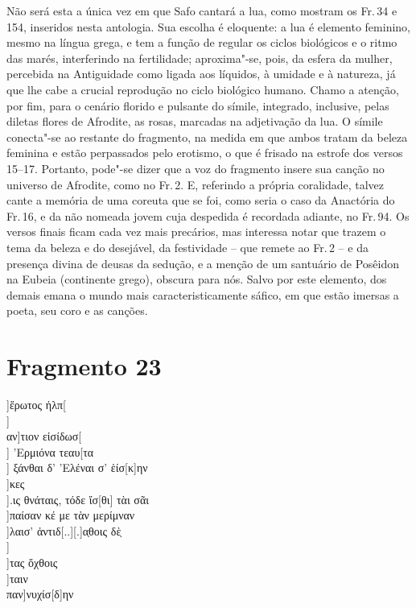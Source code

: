 {Não será esta a única vez em que Safo cantará a lua,
como mostram os Fr.\,34 e 154, inseridos nesta antologia. Sua escolha é
eloquente: a lua é elemento feminino, mesmo na língua grega, e tem a função de
regular os ciclos biológicos e o ritmo das marés, interferindo na fertilidade;
aproxima"-se, pois, da esfera da mulher, percebida na Antiguidade como ligada
aos líquidos, à umidade e à natureza, já que lhe cabe a crucial
reprodução no ciclo biológico humano. Chamo a atenção, por fim, para o cenário
florido e pulsante do símile, integrado, inclusive, pelas diletas flores de
Afrodite, as rosas, marcadas na adjetivação da lua. O símile conecta"-se
ao restante do fragmento, na medida em que ambos tratam da beleza feminina e
estão perpassados pelo erotismo, o que é frisado na estrofe dos versos 15--17.
Portanto, pode"-se dizer que a voz do fragmento insere sua canção no universo de
Afrodite, como no Fr.\,2.
E, referindo a própria coralidade, talvez cante a memória de uma coreuta que se foi, como seria o caso da Anactória do Fr.\,16, e da não nomeada jovem cuja despedida é recordada adiante, no Fr.\,94.
Os versos finais ficam cada vez mais precários, mas interessa notar que trazem o tema da beleza e do desejável, da festividade -- que remete ao Fr.\,2 -- e da presença divina de deusas da sedução, e a menção de um santuário de Posêidon na Eubeia (continente grego), obscura para nós. Salvo por este elemento, dos demais emana o mundo mais caracteristicamente sáfico, em que estão imersas a poeta, seu coro e as canções.}

\pagebreak
\section{Fragmento 23}

\begin{gkverse}
]ἕρωτος  ἠλπ[\\
		       ]\\
		   αν]τιον εἰσίδωσ[\\
		       ] ’Ερμιόνα τεαυ[τα\\
	   ] ξάνθαι δ’ ’Ελέναι σ’ ἑίσ[κ]ην\\
	]κες \\
	].ις θνάταις, τόδε ἴσ[θι] τὰι σᾶι\\
	]παίσαν κέ με τὰν μερίμναν\\
	]λαισ’ ἀντιδ[..][.]α̣θοις δὲ̣\\
     ]\\
				]τας ὄχθοις\\
			          ]ταιν\\
			      παν]νυχίσ[δ]ην
\end{gkverse}

